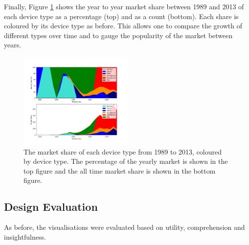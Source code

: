 \documentclass[conference]{IEEEtran}
\begin{document}

Finally, Figure \ref{fig:MarketShareYear} shows the year to year market share
between 1989 and 2013 of each device type as a percentage (top) and as a count
(bottom). Each share is coloured by its device type as before. This allows
one to compare the growth of different types over time and to gauge the popularity of the market between years.


\begin{figure}
    \centering
    \includegraphics[width=0.5\textwidth]{../Visualisations/B/share-year.png}
    \caption{The market share of each device type from 1989 to 2013,
	coloured by device type. The percentage of the yearly market is shown
	in the top figure and the all time market share is shown in the
	bottom figure.}
    \label{fig:MarketShareYear}
\end{figure}

\subsection{Design Evaluation}

As before, the visualisations were evaluated based on utility, comprehension
and insightfulness.
\end{document}
